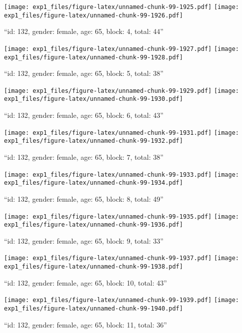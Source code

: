\documentclass[,]{article}
\begin{document}
\texttt{[image: exp1\_files/figure-latex/unnamed-chunk-99-1925.pdf]}
\texttt{[image: exp1\_files/figure-latex/unnamed-chunk-99-1926.pdf]}

\newpage
[1] 

``id: 132, gender: female, age: 65, block: 4, total: 44''

\texttt{[image: exp1\_files/figure-latex/unnamed-chunk-99-1927.pdf]}
\texttt{[image: exp1\_files/figure-latex/unnamed-chunk-99-1928.pdf]}

\newpage
[1] 

``id: 132, gender: female, age: 65, block: 5, total: 38''

\texttt{[image: exp1\_files/figure-latex/unnamed-chunk-99-1929.pdf]}
\texttt{[image: exp1\_files/figure-latex/unnamed-chunk-99-1930.pdf]}

\newpage
[1] 

``id: 132, gender: female, age: 65, block: 6, total: 43''

\texttt{[image: exp1\_files/figure-latex/unnamed-chunk-99-1931.pdf]}
\texttt{[image: exp1\_files/figure-latex/unnamed-chunk-99-1932.pdf]}

\newpage
[1] 

``id: 132, gender: female, age: 65, block: 7, total: 38''

\texttt{[image: exp1\_files/figure-latex/unnamed-chunk-99-1933.pdf]}
\texttt{[image: exp1\_files/figure-latex/unnamed-chunk-99-1934.pdf]}

\newpage
[1] 

``id: 132, gender: female, age: 65, block: 8, total: 49''

\texttt{[image: exp1\_files/figure-latex/unnamed-chunk-99-1935.pdf]}
\texttt{[image: exp1\_files/figure-latex/unnamed-chunk-99-1936.pdf]}

\newpage
[1] 

``id: 132, gender: female, age: 65, block: 9, total: 33''

\texttt{[image: exp1\_files/figure-latex/unnamed-chunk-99-1937.pdf]}
\texttt{[image: exp1\_files/figure-latex/unnamed-chunk-99-1938.pdf]}

\newpage
[1] 

``id: 132, gender: female, age: 65, block: 10, total: 43''

\texttt{[image: exp1\_files/figure-latex/unnamed-chunk-99-1939.pdf]}
\texttt{[image: exp1\_files/figure-latex/unnamed-chunk-99-1940.pdf]}

\newpage
[1] 

``id: 132, gender: female, age: 65, block: 11, total: 36''
\end{document}
